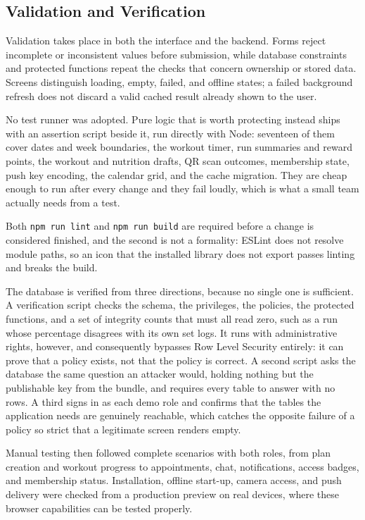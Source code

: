 \subsection{Validation and Verification}\label{subsect:ValidationVerification}

Validation takes place in both the interface and the backend. Forms reject incomplete or inconsistent values before submission, while database constraints and protected functions repeat the checks that concern ownership or stored data. Screens distinguish loading, empty, failed, and offline states; a failed background refresh does not discard a valid cached result already shown to the user.

No test runner was adopted. Pure logic that is worth protecting instead ships with an assertion script beside it, run directly with Node: seventeen of them cover dates and week boundaries, the workout timer, run summaries and reward points, the workout and nutrition drafts, QR scan outcomes, membership state, push key encoding, the calendar grid, and the cache migration. They are cheap enough to run after every change and they fail loudly, which is what a small team actually needs from a test.

Both \texttt{npm run lint} and \texttt{npm run build} are required before a change is considered finished, and the second is not a formality: ESLint does not resolve module paths, so an icon that the installed library does not export passes linting and breaks the build.

The database is verified from three directions, because no single one is sufficient. A verification script checks the schema, the privileges, the policies, the protected functions, and a set of integrity counts that must all read zero, such as a run whose percentage disagrees with its own set logs. It runs with administrative rights, however, and consequently bypasses Row Level Security entirely: it can prove that a policy exists, not that the policy is correct. A second script asks the database the same question an attacker would, holding nothing but the publishable key from the bundle, and requires every table to answer with no rows. A third signs in as each demo role and confirms that the tables the application needs are genuinely reachable, which catches the opposite failure of a policy so strict that a legitimate screen renders empty.

Manual testing then followed complete scenarios with both roles, from plan creation and workout progress to appointments, chat, notifications, access badges, and membership status. Installation, offline start-up, camera access, and push delivery were checked from a production preview on real devices, where these browser capabilities can be tested properly.
